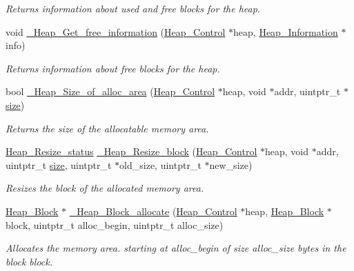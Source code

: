 \begin{DoxyCompactItemize}
\begin{DoxyCompactList}\small\item\em Returns information about used and free blocks for the heap. \end{DoxyCompactList}\item 
void \mbox{\hyperlink{group__RTEMSScoreHeap_gaf7bc4e8658d953f8b178f4ff6453ec6e}{\+\_\+\+Heap\+\_\+\+Get\+\_\+free\+\_\+information}} (\mbox{\hyperlink{structHeap__Control}{Heap\+\_\+\+Control}} $\ast$heap, \mbox{\hyperlink{structHeap__Information}{Heap\+\_\+\+Information}} $\ast$info)
\begin{DoxyCompactList}\small\item\em Returns information about free blocks for the heap. \end{DoxyCompactList}\item 
bool \mbox{\hyperlink{group__RTEMSScoreHeap_ga8985839270f72039581fb4ddc44d433a}{\+\_\+\+Heap\+\_\+\+Size\+\_\+of\+\_\+alloc\+\_\+area}} (\mbox{\hyperlink{structHeap__Control}{Heap\+\_\+\+Control}} $\ast$heap, void $\ast$addr, uintptr\+\_\+t $\ast$\mbox{\hyperlink{sun4u_2tte_8h_a245260f6f74972558f61b85227df5aae}{size}})
\begin{DoxyCompactList}\small\item\em Returns the size of the allocatable memory area. \end{DoxyCompactList}\item 
\mbox{\hyperlink{group__RTEMSScoreHeap_gac2cffc99d60d783b92e79fd412d1cbdc}{Heap\+\_\+\+Resize\+\_\+status}} \mbox{\hyperlink{group__RTEMSScoreHeap_ga89495f3d0b1206d098d2733d37c1610e}{\+\_\+\+Heap\+\_\+\+Resize\+\_\+block}} (\mbox{\hyperlink{structHeap__Control}{Heap\+\_\+\+Control}} $\ast$heap, void $\ast$addr, uintptr\+\_\+t \mbox{\hyperlink{sun4u_2tte_8h_a245260f6f74972558f61b85227df5aae}{size}}, uintptr\+\_\+t $\ast$old\+\_\+size, uintptr\+\_\+t $\ast$new\+\_\+size)
\begin{DoxyCompactList}\small\item\em Resizes the block of the allocated memory area. \end{DoxyCompactList}\item 
\mbox{\hyperlink{structHeap__Block}{Heap\+\_\+\+Block}} $\ast$ \mbox{\hyperlink{group__RTEMSScoreHeap_ga4e78547be096281a6f5189402e639cd8}{\+\_\+\+Heap\+\_\+\+Block\+\_\+allocate}} (\mbox{\hyperlink{structHeap__Control}{Heap\+\_\+\+Control}} $\ast$heap, \mbox{\hyperlink{structHeap__Block}{Heap\+\_\+\+Block}} $\ast$block, uintptr\+\_\+t alloc\+\_\+begin, uintptr\+\_\+t alloc\+\_\+size)
\begin{DoxyCompactList}\small\item\em Allocates the memory area. starting at {\itshape alloc\+\_\+begin} of size {\itshape alloc\+\_\+size} bytes in the block {\itshape block}. \end{DoxyCompactList}\item 

\end{DoxyCompactItemize}
